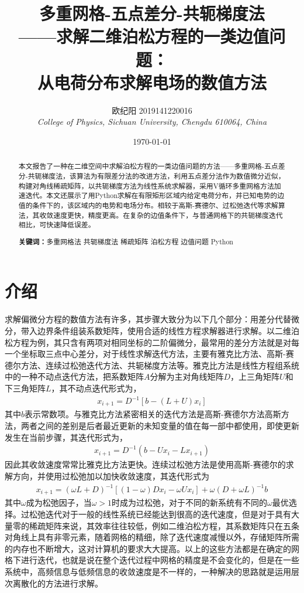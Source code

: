 \documentclass{article} %
\title{多重网格-五点差分-共轭梯度法\\——求解二维泊松方程的一类边值问题：\\从电荷分布求解电场的数值方法} %
\author{欧纪阳 2019141220016\\ \textit{College of Physics, Sichuan University, Chengdu 610064, China}} %
\date{\today} %
\begin{document}
\maketitle %
\begin{abstract} %
    \quad 本文报告了一种在二维空间中求解泊松方程的一类边值问题的方法——多重网格-五点差分-共轭梯度法，该算法为有限差分法的改进方法，利用五点差分法作为数值微分近似，构建对角线稀疏矩阵，以共轭梯度方法为线性系统求解器，采用V循环多重网格方法加速迭代。本文还展示了用Python求解在有限矩形区域内给定电荷分布，并已知电势的边值的条件下的，该区域内的电势和电场分布。相较于高斯-赛德尔、过松弛迭代等求解算法，其收敛速度更快，精度更高。在复杂的边值条件下，与普通网格下的共轭梯度迭代相比，可快速降低误差。

    \textbf{关键词：}多重网格法 \quad 共轭梯度法 \quad 稀疏矩阵 \quad 泊松方程 \quad 边值问题 \quad Python
\end{abstract}

\tableofcontents %
\thispagestyle{empty} %

\newpage

\section{介绍}
求解偏微分方程的数值方法有许多，其步骤大致分为以下几个部分：用差分代替微分，带入边界条件组装系数矩阵，使用合适的线性方程求解器进行求解。以二维泊松方程为例，其只含有两项对相同坐标的二阶偏微分，最常用的差分方法就是对每一个坐标取三点中心差分，对于线性求解迭代方法，主要有雅克比方法、高斯-赛德尔方法、连续过松弛迭代方法、共轭梯度方法等。雅克比方法是线性方程组系统中的一种不动点迭代方法，把系数矩阵$A$分解为主对角线矩阵$D$，上三角矩阵$U$和下三角矩阵$L$，其不动点迭代形式为，
\begin{align}
    x_{i+1}=D^{-1}[b-(L+U)x_i]
\end{align}
其中$b$表示常数项。与雅克比方法紧密相关的迭代方法是高斯-赛德尔方法高斯方法，两者之间的差别是后者最近更新的未知变量的值在每一部中都使用，即使更新发生在当前步骤，其迭代形式为，
\begin{align}
    x_{i+1}=D^{-1}(b-Ux_{i}-Lx_{i+1})
\end{align}
因此其收敛速度常常比雅克比方法更快。连续过松弛方法是使用高斯-赛德尔的求解方向，并使用过松弛加以加快收敛速度，其迭代形式为
\begin{align}
    x_{i+1}=(\omega L+D)^{-1}[(1-\omega)Dx_i-\omega Ux_i]+\omega (D+\omega L)^{-1}b
\end{align}
其中$\omega$成为松弛因子，当$\omega >1$时成为过松弛，对于不同的新系统有不同的$\omega$最优选择。过松弛迭代对于一般的线性系统已经能达到很高的迭代速度，但是对于具有大量零的稀疏矩阵来说，其效率往往较低，例如二维泊松方程，其系数矩阵只在五条对角线上具有非零元素，随着网格的精细，除了迭代速度减慢以外，存储矩阵所需的内存也不断增大，这对计算机的要求大大提高。以上的这些方法都是在确定的网格下进行迭代，也就是说在整个迭代过程中网格的精度是不会变化的，但是在一些系统中，高频信息与低频信息的收敛速度是不一样的，一种解决的思路就是运用层次离散化的方法进行求解。
\end{document}

